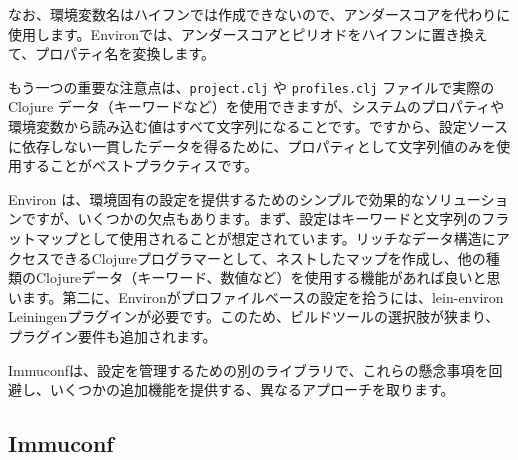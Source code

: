 なお、環境変数名はハイフンでは作成できないので、アンダースコアを代わりに使用します。Environでは、アンダースコアとピリオドをハイフンに置き換えて、プロパティ名を変換します。

もう一つの重要な注意点は、\texttt{project.clj} や \texttt{profiles.clj} ファイルで実際の Clojure データ（キーワードなど）を使用できますが、システムのプロパティや環境変数から読み込む値はすべて文字列になることです。ですから、設定ソースに依存しない一貫したデータを得るために、プロパティとして文字列値のみを使用することがベストプラクティスです。

Environ は、環境固有の設定を提供するためのシンプルで効果的なソリューションですが、いくつかの欠点もあります。まず、設定はキーワードと文字列のフラットマップとして使用されることが想定されています。リッチなデータ構造にアクセスできるClojureプログラマーとして、ネストしたマップを作成し、他の種類のClojureデータ（キーワード、数値など）を使用する機能があれば良いと思います。第二に、Environがプロファイルベースの設定を拾うには、lein-environ Leiningenプラグインが必要です。このため、ビルドツールの選択肢が狭まり、プラグイン要件も追加されます。

Immuconfは、設定を管理するための別のライブラリで、これらの懸念事項を回避し、いくつかの追加機能を提供する、異なるアプローチを取ります。


\subsection{Immuconf}






